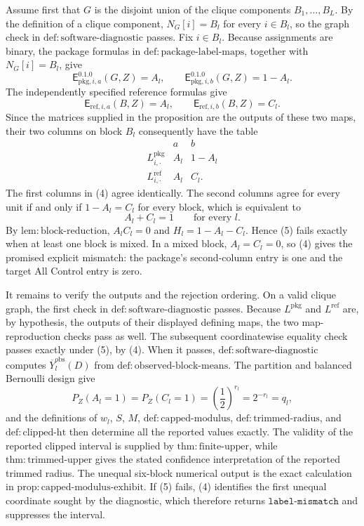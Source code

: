 Assume first that \(G\) is the disjoint union of the clique components
\(B_1,\ldots,B_L\).  By the definition of a clique component,
\(N_G[i]=B_l\) for every \(i\in B_l\), so the graph check in
\(\mathrm{def{:}software\text{-}diagnostic}\) passes.  Fix \(i\in B_l\).
Because assignments are binary, the package formulas in
\(\mathrm{def{:}package\text{-}label\text{-}maps}\), together with
\(N_G[i]=B_l\), give
\[
 \mathsf E^{0.1.0}_{\mathrm{pkg},i,a}(G,Z)=A_l,
 \qquad
 \mathsf E^{0.1.0}_{\mathrm{pkg},i,b}(G,Z)=1-A_l.
\]
The independently specified reference formulas give
\[
 \mathsf E_{\mathrm{ref},i,a}(B,Z)=A_l,
 \qquad
 \mathsf E_{\mathrm{ref},i,b}(B,Z)=C_l.
\]
Since the matrices supplied in the proposition are the outputs of these two maps, their two columns on block \(B_l\) consequently have the table
\[
 \begin{array}{c|cc}
  &a&b\\ \hline
 L^{\mathrm{pkg}}_{i,\cdot}&A_l&1-A_l\\
 L^{\mathrm{ref}}_{i,\cdot}&A_l&C_l.
 \end{array}
\tag{4}
\]
The first columns in (4) agree identically.  The second columns agree for every unit if and only if
\(1-A_l=C_l\) for every block, which is equivalent to
\[
 A_l+C_l=1\qquad\text{for every }l.
\tag{5}
\]
By \(\mathrm{lem{:}block\text{-}reduction}\), \(A_lC_l=0\) and
\(H_l=1-A_l-C_l\).  Hence (5) fails exactly when at least one block is mixed.  In a mixed block, \(A_l=C_l=0\), so (4) gives the promised explicit mismatch: the package's second-column entry is one and the target All Control entry is zero.

It remains to verify the outputs and the rejection ordering.  On a valid clique graph, the first check in
\(\mathrm{def{:}software\text{-}diagnostic}\) passes.  Because
\(L^{\mathrm{pkg}}\) and \(L^{\mathrm{ref}}\) are, by hypothesis, the outputs of their displayed defining maps, the two map-reproduction checks pass as well.  The subsequent coordinatewise equality check passes exactly under (5), by (4).  When it passes,
\(\mathrm{def{:}software\text{-}diagnostic}\) computes
\(\overline Y_l^{\mathrm{obs}}(D)\) from
\(\mathrm{def{:}observed\text{-}block\text{-}means}\).  The partition and balanced Bernoulli design give
\[
 P_Z(A_l=1)=P_Z(C_l=1)=\left(\frac12\right)^{r_l}=2^{-r_l}=q_l,
\]
and the definitions of \(w_l\), \(S\), \(M\),
\(\mathrm{def{:}capped\text{-}modulus}\),
\(\mathrm{def{:}trimmed\text{-}radius}\), and
\(\mathrm{def{:}clipped\text{-}ht}\) then determine all the reported values exactly.  The validity of the reported clipped interval is supplied by
\(\mathrm{thm{:}finite\text{-}upper}\), while
\(\mathrm{thm{:}trimmed\text{-}upper}\) gives the stated confidence interpretation of the reported trimmed radius.  The unequal six-block numerical output is the exact calculation in
\(\mathrm{prop{:}capped\text{-}modulus\text{-}exhibit}\).  If (5) fails, (4) identifies the first unequal coordinate sought by the diagnostic, which therefore returns
\(\texttt{label-mismatch}\) and suppresses the interval.

